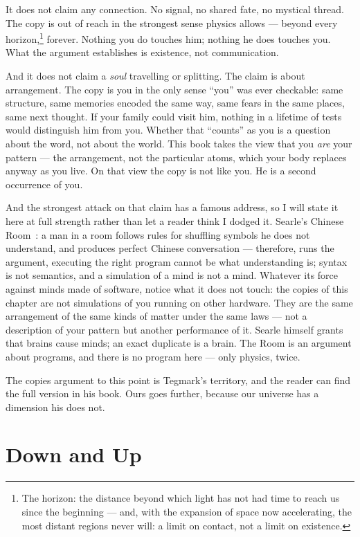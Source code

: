 \documentclass[fontsize=11pt,paper=a4,pagesize=auto,parskip=half-]{scrbook}
\newcommand{\Iy}[1]{#1\index{#1}}
\begin{document}
It does not claim any connection. No signal, no shared fate, no mystical thread. The copy is out of reach in the strongest sense physics allows --- beyond every horizon,\footnote{The horizon: the distance beyond which light has not had time to reach us since the beginning --- and, with the expansion of space now accelerating, the most distant regions never will: a limit on contact, not a limit on existence.} forever. Nothing you do touches him; nothing he does touches you. What the argument establishes is existence, not communication.

And it does not claim a \emph{soul} travelling or splitting. The claim is about arrangement. The copy is you in the only sense ``you'' was ever checkable: same structure, same memories encoded the same way, same fears in the same places, same next thought. If your family could visit him, nothing in a lifetime of tests would distinguish him from you. Whether that ``counts'' as you is a question about the word, not about the world. This book takes the view that you \emph{are} your pattern --- the arrangement, not the particular atoms, which your body replaces anyway as you live. On that view the copy is not like you. He is a second occurrence of you.

And the strongest attack on that claim has a famous address, so I will state it here at full strength rather than let a reader think I dodged it. \Iy{Searle}'s Chinese Room~\cite{searle1980}: a man in a room follows rules for shuffling symbols he does not understand, and produces perfect Chinese conversation --- therefore, runs the argument, executing the right program cannot be what understanding is; syntax is not semantics, and a simulation of a mind is not a mind. Whatever its force against minds made of software, notice what it does not touch: the copies of this chapter are not simulations of you running on other hardware. They are the same arrangement of the same kinds of matter under the same laws --- not a description of your pattern but another performance of it. Searle himself grants that brains cause minds; an exact duplicate is a brain. The Room is an argument about programs, and there is no program here --- only physics, twice.

The copies argument to this point is Tegmark's territory, and the reader can find the full version in his book. Ours goes further, because our universe has a dimension his does not.

\section{Down and Up}
\end{document}

